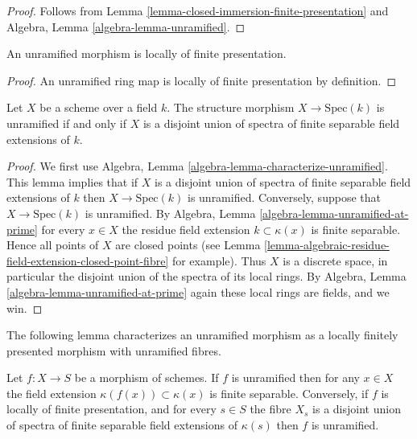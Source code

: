 \begin{proof}
Follows from Lemma \ref{lemma-closed-immersion-finite-presentation} and
Algebra, Lemma \ref{algebra-lemma-unramified}.
\end{proof}

\begin{lemma}
\label{lemma-unramified-locally-finite-presentation}
An unramified morphism is locally of finite presentation.
\end{lemma}

\begin{proof}
An unramified ring map is locally of finite presentation by definition.
\end{proof}

\begin{lemma}
\label{lemma-unramified-over-field}
Let $X$ be a scheme over a field $k$.
The structure morphism $X \to \text{Spec}(k)$ is unramified if
and only if $X$ is a disjoint union of spectra of finite separable
field extensions of $k$.
\end{lemma}

\begin{proof}
We first use Algebra, Lemma \ref{algebra-lemma-characterize-unramified}.
This lemma implies that if $X$ is a disjoint union of spectra of finite
separable field extensions of $k$ then $X \to \text{Spec}(k)$ is unramified.
Conversely, suppose that $X \to \text{Spec}(k)$ is unramified.
By Algebra, Lemma \ref{algebra-lemma-unramified-at-prime} for every $x \in X$
the residue field extension $k \subset \kappa(x)$ is
finite separable. Hence all points of $X$ are closed points (see
Lemma \ref{lemma-algebraic-residue-field-extension-closed-point-fibre}
for example). Thus $X$ is a discrete space, in particular the disjoint union
of the spectra of its local rings. By
Algebra, Lemma \ref{algebra-lemma-unramified-at-prime} again these
local rings are fields, and we win.
\end{proof}

\noindent
The following lemma characterizes an unramified morphism as a
locally finitely presented morphism with unramified fibres.

\begin{lemma}
\label{lemma-unramfied-etale-fibres}
Let $f : X \to S$ be a morphism of schemes.
If $f$ is unramified then for any $x \in X$ the field extension
$\kappa(f(x)) \subset \kappa(x)$ is finite separable. Conversely,
if $f$ is locally of finite presentation, and for every $s \in S$
the fibre $X_s$ is a disjoint union of spectra of finite separable
field extensions of $\kappa(s)$ then $f$ is unramified.
\end{lemma}

